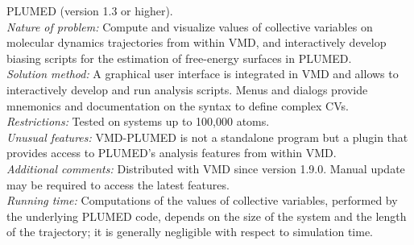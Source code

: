 \documentclass[preprint,review,11pt]{elsarticle}
\begin{document}
\begin{small}
  PLUMED (version 1.3 or higher). \\
  {\em Nature of problem:} Compute and visualize values of collective
  variables on molecular dynamics trajectories from within VMD, and
  interactively develop biasing scripts for the estimation of
  free-energy surfaces in PLUMED.
  \\
  {\em Solution method:} A graphical user interface is integrated in
  VMD and allows to interactively develop and run analysis scripts.
  Menus and dialogs provide mnemonics and documentation on the syntax
  to define complex CVs.
  \\
  {\em Restrictions:}
  Tested on systems up to 100,000 atoms. \\
  {\em Unusual features:} VMD-PLUMED is not a standalone program but a
  plugin that provides access to PLUMED's analysis features from within VMD. \\
  {\em Additional comments:} Distributed with VMD since version 1.9.0.
  Manual  update may be required  to access the latest features.   \\
  {\em Running time:} Computations of the values of collective
  variables, performed by the underlying PLUMED code, depends on the
  size of the system and the length  of the trajectory; it is 
  generally negligible with respect to simulation time.  \\

\end{small}


\end{document}
